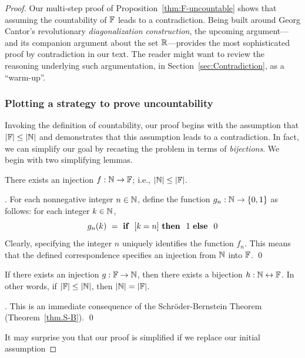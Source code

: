 \begin{proof}
Our multi-step proof of Proposition~\ref{thm:F-uncountable} shows that assuming the countability of $\mathbb{F}$ leads to a contradiction.  Being built around Georg Cantor's revolutionary {\it diagonalization construction}, the upcoming argument---and its companion argument about the set $\mathbb{R}$---provides the most sophisticated proof by contradiction in our text.  The reader might want to review the reasoning underlying such argumentation, in Section~\ref{sec:Contradiction}, as a ``warm-up''.

\subsubsection{Plotting a strategy to prove uncountability}
\label{sec:the-diag-strategy}

Invoking the definition of countability, our proof begins with the assumption that $|\mathbb{F}| \leq |\mathbb{N}|$ and demonstrates that this assumption leads to a contradiction.  In fact, we can simplify our goal by recasting the problem in terms of {\em bijections}.  We begin with two simplifying lemmas.

\begin{lemma}
\label{lem:N-leq-F}
There exists an injection $f: \mathbb{N} \rightarrow \mathbb{F}$; i.e., $|\mathbb{N}| \leq |\mathbb{F}|$.
\end{lemma}

.
For each nonnegative integer $n \in \mathbb{N}$, define the function $g_n: \mathbb{N} \rightarrow \{0,1\}$ as follows: for each integer $k \in \mathbb{N}$,
\[ g_n(k) \ = \ \mbox{\bf if } \ [k=n] \ \mbox{\bf then } \ 1
\ \mbox{\bf else } \ 0
\]
Clearly, specifying the integer $n$ uniquely identifies the function $f_n$.  This means that the defined correspondence specifies an injection from $\mathbb{N}$ into $\mathbb{F}$.  \qed

\begin{lemma}
\label{lem:N-=-F}
If there exists an injection $g: \mathbb{F} \rightarrow \mathbb{N}$, then there exists a bijection $h: \mathbb{N} \leftrightarrow \mathbb{F}$.  In other words, if $|\mathbb{F}| \leq |\mathbb{N}|$, then $|\mathbb{N}| = |\mathbb{F}|$.
\end{lemma}

.
This is an immediate consequence of the Schr\"{o}der-Bernstein Theorem (Theorem~\ref{thm.S-B}).  \qed

\medskip

It may surprise you that our proof is simplified if we replace our initial assumption

\smallskip


\end{proof}
